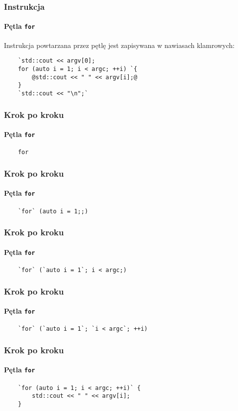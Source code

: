 \documentclass[aspectratio=169]{beamer}
\begin{document}
\begin{frame}[fragile]
    \frametitle{Instrukcja}
    \framesubtitle{Pętla {\tt for}}

    Instrukcja powtarzana przez pętlę jest zapisywana w nawiasach klamrowych:

    \begin{lstlisting}
    `std::cout << argv[0];
    for (auto i = 1; i < argc; ++i) `{
        @std::cout << " " << argv[i];@
    }
    `std::cout << "\n";`
    \end{lstlisting}
\end{frame}

\begin{frame}[fragile]
    \frametitle{Krok po kroku}
    \framesubtitle{Pętla {\tt for}}

    \begin{lstlisting}
    for
    \end{lstlisting}
    \vspace{2.4em}
\end{frame}

\begin{frame}[fragile]
    \frametitle{Krok po kroku}
    \framesubtitle{Pętla {\tt for}}

    \begin{lstlisting}
    `for` (auto i = 1;;)
    \end{lstlisting}
    \vspace{2.4em}
\end{frame}

\begin{frame}[fragile]
    \frametitle{Krok po kroku}
    \framesubtitle{Pętla {\tt for}}

    \begin{lstlisting}
    `for` (`auto i = 1`; i < argc;)
    \end{lstlisting}
    \vspace{2.4em}
\end{frame}

\begin{frame}[fragile]
    \frametitle{Krok po kroku}
    \framesubtitle{Pętla {\tt for}}

    \begin{lstlisting}
    `for` (`auto i = 1`; `i < argc`; ++i)
    \end{lstlisting}
    \vspace{2.4em}
\end{frame}

\begin{frame}[fragile]
    \frametitle{Krok po kroku}
    \framesubtitle{Pętla {\tt for}}

    \begin{lstlisting}
    `for (auto i = 1; i < argc; ++i)` {
        std::cout << " " << argv[i];
    }
    \end{lstlisting}
\end{frame}
\end{document}
